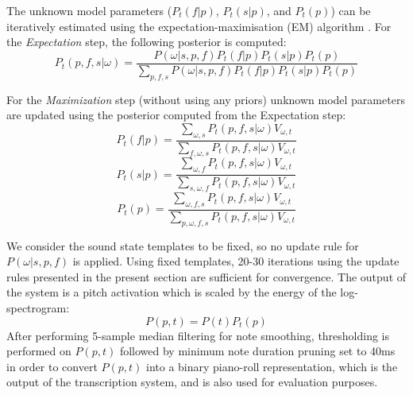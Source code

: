 The unknown model parameters ($P_{t}(f|p)$, $P_{t}(s|p)$, and $P_{t}(p)$) can be iteratively estimated using the expectation-maximisation (EM) algorithm \cite{Dempster77}. For the \emph{Expectation} step, the following posterior is computed:
 \begin{equation}
  P_{t}(p,f,s|\omega) = \frac{P(\omega|s,p,f)P_{t}(f|p)P_{t}(s|p)P_{t}(p)}{\sum_{p,f,s}P(\omega|s,p,f)P_{t}(f|p)P_{t}(s|p)P_{t}(p)} \label{eq:EStep}
 \end{equation}
  
For the \emph{Maximization} step (without using any priors) unknown model parameters are updated using the posterior computed from the Expectation step:
 \begin{equation}
 P_{t}(f|p) = \frac{\sum_{\omega,s}P_{t}(p,f,s|\omega)V_{\omega,t}}{\sum_{f,\omega,s}P_{t}(p,f,s|\omega)V_{\omega,t}} 
\end{equation}
\begin{equation}
 P_{t}(s|p) = \frac{\sum_{\omega,f}P_{t}(p,f,s|\omega)V_{\omega,t}}{\sum_{s,\omega,f}P_{t}(p,f,s|\omega)V_{\omega,t}} \label{eq:MStepInstrument}
\end{equation}
\begin{equation}
 P_{t}(p) = \frac{\sum_{\omega,f,s}P_{t}(p,f,s|\omega)V_{\omega,t}}{\sum_{p,\omega,f,s}P_{t}(p,f,s|\omega)V_{\omega,t}} \label{eq:MStepTranscription}
\end{equation}


We consider the sound state templates to be fixed, so no update rule for $P(\omega|s,p,f)$ is applied. Using fixed templates, 20-30 iterations using the update rules presented in the present section are sufficient for convergence. The output of the system is a pitch activation which is scaled by the energy of the log-spectrogram:
\begin{equation}
P(p,t) =  P(t)P_{t}(p)\label{eq:transcription}
\end{equation}
After performing 5-sample median filtering for note smoothing, thresholding is performed on $P(p,t)$ followed by minimum note duration pruning set to 40ms %
in order to convert $P(p,t)$ into a binary piano-roll representation, which is the output of the transcription system, and is also used for evaluation purposes. 